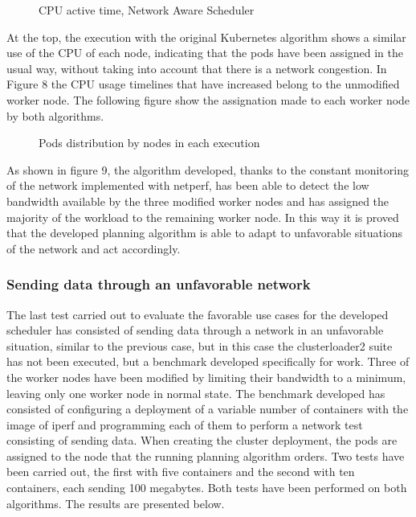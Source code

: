 \documentclass[conference]{IEEEtran}
\begin{document}
\begin{figure}[h]
\begin{center}
\strut{}
\caption{CPU active time, Network Aware Scheduler}\label{fig:cluster}
\end{center}
\end{figure}

At the top, the execution with the original Kubernetes algorithm shows a similar use of the CPU of each node, indicating that the pods have been assigned in the usual way, without taking into account that there is a network congestion. In Figure 8 the CPU usage timelines that have increased belong to the unmodified worker node. The following figure show the assignation made to each worker node by both algorithms.

\begin{figure}[h]
\begin{center}
\strut{}
\caption{Pods distribution by nodes in each execution}\label{fig:cluster}
\end{center}
\end{figure}

As shown in figure 9, the algorithm developed, thanks to the constant monitoring of the network implemented with netperf, has 
been able to detect the low bandwidth available by the three modified worker nodes and has assigned the majority of the workload to the remaining worker node. In this way it is proved that the developed 
planning algorithm is able to adapt to unfavorable situations of the network and act accordingly.

\subsubsection{Sending data through an unfavorable network}\label{sec:unfavnet}

The last test carried out to evaluate the favorable use cases for the developed scheduler has consisted of sending data through a network in an unfavorable situation, similar to the previous case, but in 
this case the clusterloader2 suite has not been executed, but a benchmark developed specifically for work. Three of the worker nodes have been modified by limiting their bandwidth to a minimum, leaving 
only one worker node in normal state. The benchmark developed has consisted of configuring a deployment of a variable number of containers with the image of iperf and programming each of them to perform a 
network test consisting of sending data. When creating the cluster deployment, the pods are assigned to the node that the running planning algorithm orders. Two tests have been carried out, the first with 
five containers and the second with ten containers, each sending 100 megabytes. Both tests have been performed on both algorithms. The results are presented below.
\end{document}
